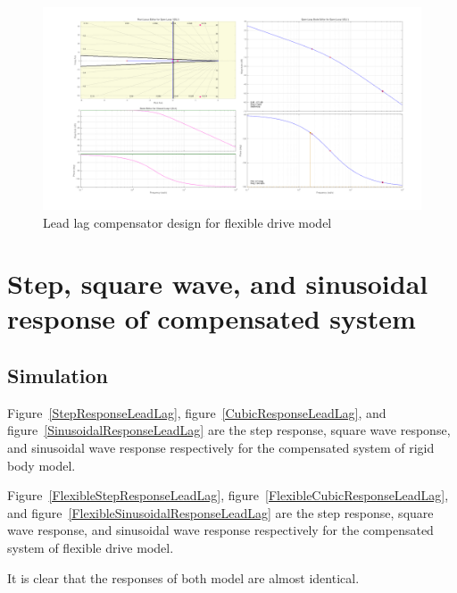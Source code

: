 \documentclass[a4paper, 12pt]{article}
\begin{document}
\begin{figure}[!htbp]
\hspace{-7ex}
\includegraphics[width = 1.2\linewidth]{FlexibleLeadLagController}
\caption{Lead lag compensator design for flexible drive model}
\label{FlexibleLeadLagController}
\end{figure}

\vspace{7ex}
\section{Step, square wave, and sinusoidal response of compensated system}

\subsection{Simulation}
\hspace{2.5ex}
Figure~\ref{StepResponseLeadLag}, figure~\ref{CubicResponseLeadLag}, and figure~\ref{SinusoidalResponseLeadLag} are the step response, square wave response, and sinusoidal wave response respectively for the compensated system of rigid body model.

Figure~\ref{FlexibleStepResponseLeadLag}, figure~\ref{FlexibleCubicResponseLeadLag}, and figure~\ref{FlexibleSinusoidalResponseLeadLag} are the step response, square wave response, and sinusoidal wave response respectively for the compensated system of flexible drive model. 

It is clear that the responses of both model are almost identical. 
\end{document}
